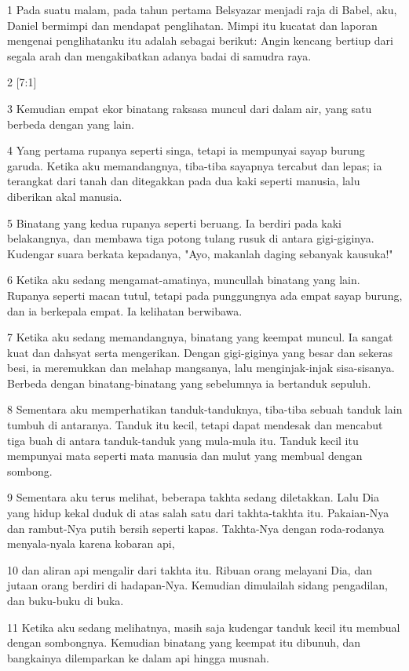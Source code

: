 \par 1 Pada suatu malam, pada tahun pertama Belsyazar menjadi raja di Babel, aku, Daniel bermimpi dan mendapat penglihatan. Mimpi itu kucatat dan laporan mengenai penglihatanku itu adalah sebagai berikut: Angin kencang bertiup dari segala arah dan mengakibatkan adanya badai di samudra raya.
\par 2 [7:1]
\par 3 Kemudian empat ekor binatang raksasa muncul dari dalam air, yang satu berbeda dengan yang lain.
\par 4 Yang pertama rupanya seperti singa, tetapi ia mempunyai sayap burung garuda. Ketika aku memandangnya, tiba-tiba sayapnya tercabut dan lepas; ia terangkat dari tanah dan ditegakkan pada dua kaki seperti manusia, lalu diberikan akal manusia.
\par 5 Binatang yang kedua rupanya seperti beruang. Ia berdiri pada kaki belakangnya, dan membawa tiga potong tulang rusuk di antara gigi-giginya. Kudengar suara berkata kepadanya, "Ayo, makanlah daging sebanyak kausuka!"
\par 6 Ketika aku sedang mengamat-amatinya, muncullah binatang yang lain. Rupanya seperti macan tutul, tetapi pada punggungnya ada empat sayap burung, dan ia berkepala empat. Ia kelihatan berwibawa.
\par 7 Ketika aku sedang memandangnya, binatang yang keempat muncul. Ia sangat kuat dan dahsyat serta mengerikan. Dengan gigi-giginya yang besar dan sekeras besi, ia meremukkan dan melahap mangsanya, lalu menginjak-injak sisa-sisanya. Berbeda dengan binatang-binatang yang sebelumnya ia bertanduk sepuluh.
\par 8 Sementara aku memperhatikan tanduk-tanduknya, tiba-tiba sebuah tanduk lain tumbuh di antaranya. Tanduk itu kecil, tetapi dapat mendesak dan mencabut tiga buah di antara tanduk-tanduk yang mula-mula itu. Tanduk kecil itu mempunyai mata seperti mata manusia dan mulut yang membual dengan sombong.
\par 9 Sementara aku terus melihat, beberapa takhta sedang diletakkan. Lalu Dia yang hidup kekal duduk di atas salah satu dari takhta-takhta itu. Pakaian-Nya dan rambut-Nya putih bersih seperti kapas. Takhta-Nya dengan roda-rodanya menyala-nyala karena kobaran api,
\par 10 dan aliran api mengalir dari takhta itu. Ribuan orang melayani Dia, dan jutaan orang berdiri di hadapan-Nya. Kemudian dimulailah sidang pengadilan, dan buku-buku di buka.
\par 11 Ketika aku sedang melihatnya, masih saja kudengar tanduk kecil itu membual dengan sombongnya. Kemudian binatang yang keempat itu dibunuh, dan bangkainya dilemparkan ke dalam api hingga musnah.
